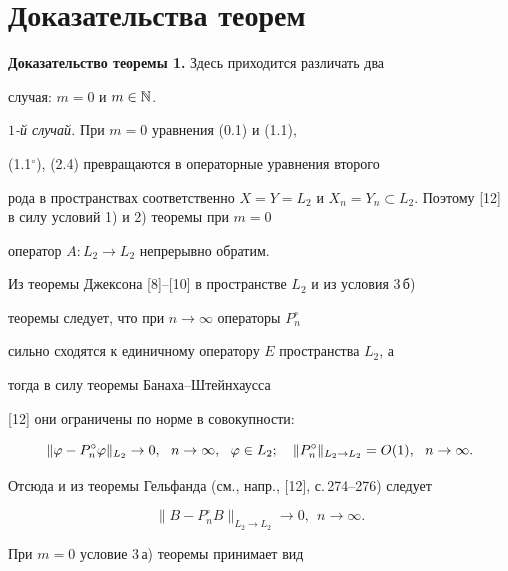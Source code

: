 \section{Доказательства теорем }





{\bf Доказательство теоремы 1.} Здесь приходится различать два


случая: $m=0$ и $m\in \Bbb {N}$.





{\it $1$-й случай.} При $m=0$ уравнения (0.1) и (1.1),


(1.1$^\circ$), (2.4) превращаются в операторные уравнения второго


рода в пространствах соответственно $X=Y=L_2$ и $X_n = Y_n \subset


L_2$. Поэтому [12] в силу условий 1) и 2) теоремы при $m=0$


оператор $A:L_2\to L_2$ непрерывно обратим.





Из теоремы Джексона [8]--[10] в пространстве $L_2$ и из условия 3\,б)


теоремы следует, что при $n\to \infty$ операторы $P_n^\circ$


сильно сходятся к единичному оператору $E$ пространства $L_2$, а


тогда в силу теоремы Банаха--Штейнхаусса


[12] они ограничены по норме в совокупности:


\begin{equation}


\|\vp - P_n^\circ\vp\|_{L_2}\to 0,\ \ n\to \infty,\ \ \vp\in


L_2;\quad \|P_n^\circ\|_{L_2\to L_2} = O(1),\ \ n\to \infty.


\end{equation}


Отсюда и из теоремы Гельфанда (см., напр., [12], с.\,274--276) следует


\begin{equation}


\|B - P_n^\circ B\|_{L_2\to L_2} \to 0,\ \ n\to \infty.


\end{equation}





При $m=0$  условие 3\,а) теоремы принимает вид



